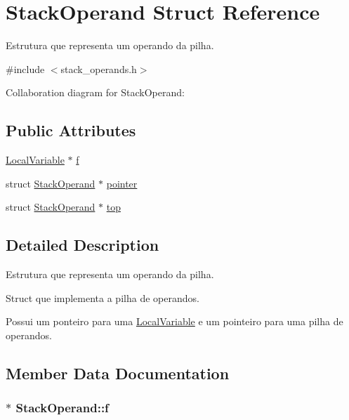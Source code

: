 \hypertarget{structStackOperand}{}\section{Stack\+Operand Struct Reference}
\label{structStackOperand}


Estrutura que representa um operando da pilha.  




{\ttfamily \#include $<$stack\+\_\+operands.\+h$>$}



Collaboration diagram for Stack\+Operand\+:
\subsection*{Public Attributes}
\begin{DoxyCompactItemize}
\item 
\hyperlink{structLocalVariable}{Local\+Variable} $\ast$ \hyperlink{structStackOperand_ac2430d118d01240603507706e8a8adff}{f}
\item 
struct \hyperlink{structStackOperand}{Stack\+Operand} $\ast$ \hyperlink{structStackOperand_af4ad4c3c4e49be261c61b3856bc02b9f}{pointer}
\item 
struct \hyperlink{structStackOperand}{Stack\+Operand} $\ast$ \hyperlink{structStackOperand_a11a33c73ab08f65a14fb53af2308d052}{top}
\end{DoxyCompactItemize}


\subsection{Detailed Description}
Estrutura que representa um operando da pilha. 

Struct que implementa a pilha de operandos.

Possui um ponteiro para uma \hyperlink{structLocalVariable}{Local\+Variable} e um pointeiro para uma pilha de operandos. 

\subsection{Member Data Documentation}
\subsubsection[{\texorpdfstring{f}{f}}]{$\ast$ Stack\+Operand\+::f}\hypertarget{structStackOperand_ac2430d118d01240603507706e8a8adff}{}\label{structStackOperand_ac2430d118d01240603507706e8a8adff}
